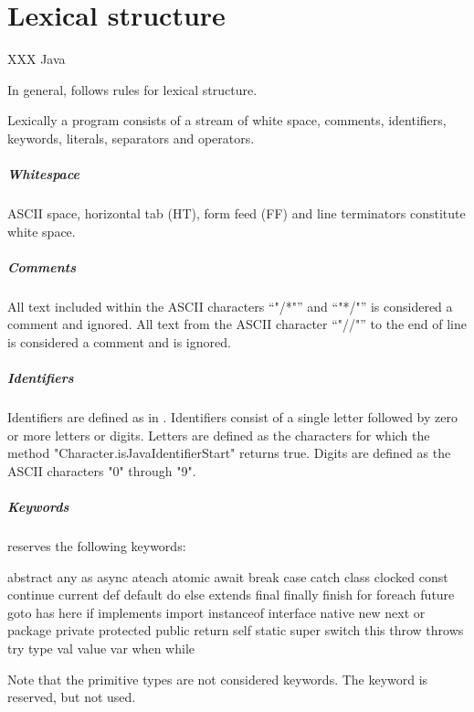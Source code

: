 \chapter{Lexical structure}

XXX Java

In general, \Xten{} follows \java{} rules \cite[Chapter 3]{jls2} for
lexical structure.

Lexically a program consists of a stream of white space, comments,
identifiers, keywords, literals, separators and operators.

\paragraph{Whitespace}
ASCII space, horizontal tab (HT), form feed (FF) and line terminators constitute white space.


\paragraph{Comments}
All text included within the ASCII characters ``\xcd"/*"'' and
``\xcd"*/"'' is
considered a comment and ignored. All text from the ASCII character
``\xcd"//"'' to the end of line is considered a comment and is ignored.

\paragraph{Identifiers}

Identifiers  are defined as in \java.
Identifiers consist of a single letter followed by zero or more
letters or digits.
Letters are defined as the characters for which the \java{}
method \xcd"Character.isJavaIdentifierStart" returns true.
Digits are defined as the ASCII characters \xcd"0" through \xcd"9".

\paragraph{Keywords}
\Xten{} reserves the following keywords:
\begin{xten}
abstract        any             as              async
ateach          atomic          await           break
case            catch           class           clocked
const           continue        current         def
default         do              else            extends
final           finally         finish          for
foreach         future          goto            has
here            if              implements      import
instanceof      interface       native          new
next            or              package         private
protected       public          return          self
static          super           switch          this
throw           throws          try             type
val             value           var             when
while
\end{xten}
Note that the primitive types are not considered keywords.
The keyword  is reserved, but not used.

